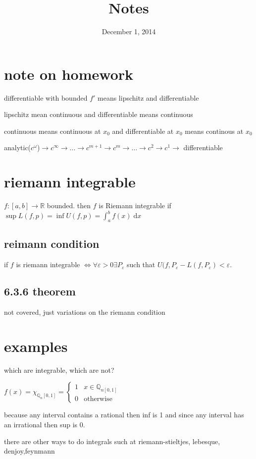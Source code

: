 \documentclass[letterpaper]{article}
\begin{document}
\title{Notes}
\date{December 1, 2014}
\maketitle
\section*{note on homework}
differentiable with bounded $f'$ means lipschitz and differentiable

lipschitz mean continuous and differentiable means continuous

continuous means continuous at $x_0$ and differentiable at $x_0$ means continous at $x_0$

analytic($c^\omega$)$\to c^\infty\to\dots\to c^{m+1}\to c^m\to\dots\to c^2\to c^1\to$ differentiable

\section*{riemann integrable}
$f:[a,b]\to\mathbb{R}$ bounded. then $f$ is Riemann integrable if $\sup L(f,p)=\inf U(f,p)=\int_a^b{f(x)\;\mathrm{d}x}$

\subsection*{reimann condition}
if $f$ is riemann integrable $\Leftrightarrow\forall \varepsilon>0\exists P_\varepsilon$ such that $U(f,P_{\varepsilon}-L(f,P_\varepsilon)<\varepsilon$.

\subsection*{6.3.6 theorem}
not covered, just variations on the riemann condition

\section*{examples}
which are integrable, which are not?

$f(x)=\chi_{\mathbb{Q}_n[0,1]}=\begin{cases}1&x\in\mathbb{Q}_{n[0,1]}\\0&\text{otherwise}\end{cases}$

because any interval contains a rational then inf is 1 and since any interval has an irrational then sup is 0.

there are other ways to do integrals such at riemann-stieltjes, lebesque, denjoy,feynmann
\end{document}
